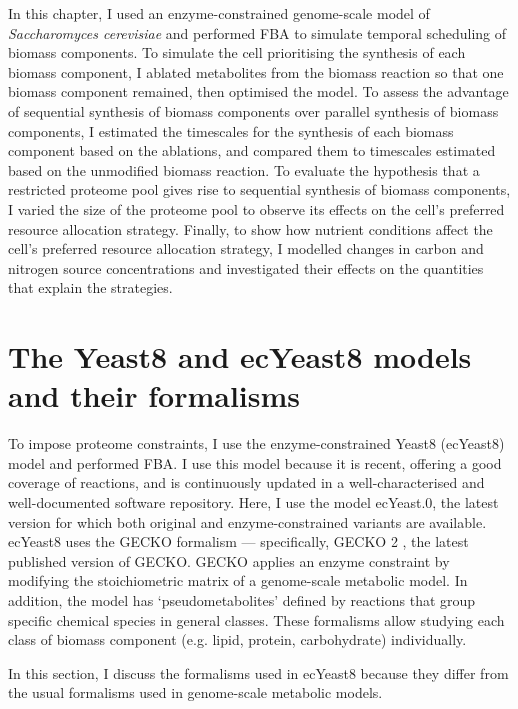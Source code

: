 In this chapter, I used an enzyme-constrained genome-scale model of \textit{Saccharomyces cerevisiae} and performed FBA to simulate temporal scheduling of biomass components.
To simulate the cell prioritising the synthesis of each biomass component, I ablated metabolites from the biomass reaction so that one biomass component remained, then optimised the model.
To assess the advantage of sequential synthesis of biomass components over parallel synthesis of biomass components, I estimated the timescales for the synthesis of each biomass component based on the ablations, and compared them to timescales estimated based on the unmodified biomass reaction.
To evaluate the hypothesis that a restricted proteome pool gives rise to sequential synthesis of biomass components, I varied the size of the proteome pool to observe its effects on the cell's preferred resource allocation strategy.
Finally, to show how nutrient conditions affect the cell's preferred resource allocation strategy, I modelled changes in carbon and nitrogen source concentrations and investigated their effects on the quantities that explain the strategies.

\section{The Yeast8 and ecYeast8 models and their formalisms}
\label{sec:model-yeast8}

To impose proteome constraints, I use the enzyme-constrained Yeast8 (ecYeast8) model \parencite{luConsensusCerevisiaeMetabolic2019} and performed FBA.
I use this model because it is recent, offering a good coverage of reactions, and is continuously updated in a well-characterised and well-documented software repository.
Here, I use the model ec\-Yeast.0, the latest version for which both original and enzyme-constrained variants are available.
ecYeast8 uses the GECKO formalism \parencite{sanchezImprovingPhenotypePredictions2017} --- specifically, GECKO 2 \parencite{domenzainReconstructionCatalogueGenomescale2022}, the latest published version of GECKO.
GECKO applies an enzyme constraint by modifying the stoichiometric matrix of a genome-scale metabolic model.
In addition, the model has `pseudometabolites' defined by reactions that group specific chemical species in general classes.
These formalisms allow studying each class of biomass component (e.g. lipid, protein, carbohydrate) individually.

In this section, I discuss the formalisms used in ecYeast8 because they differ from the usual formalisms used in genome-scale metabolic models.

